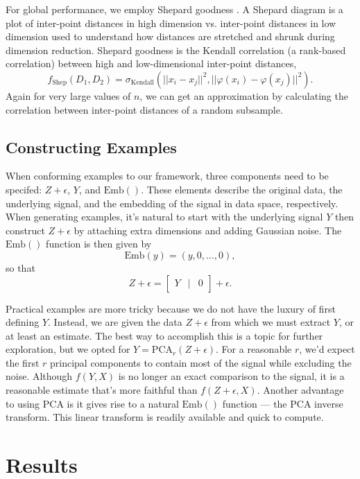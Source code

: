 \documentclass{article}
\begin{document}
\bigbreak For global performance, we employ Shepard goodness \cite{quantitative survey}. A Shepard diagram is a plot of inter-point distances in high dimension vs. inter-point distances in low dimension used to understand how distances are stretched and shrunk during dimension reduction. Shepard goodness is the Kendall correlation (a rank-based correlation) between high and low-dimensional inter-point distances, $$f_\textrm{Shep}(D_1, D_2) = \sigma_\textrm{Kendall}(||x_i - x_j||^2, ||\varphi(x_i) - \varphi(x_j)||^2).$$ Again for very large values of $n$, we can get an approximation by calculating the correlation between inter-point distances of a random subsample.

\subsection{Constructing Examples}
When conforming examples to our framework, three components need to be specifed: $Z + \epsilon$, $Y$, and $\textrm{Emb}()$. These elements describe the original data, the underlying signal, and the embedding of the signal in data space, respectively. When generating examples, it's natural to start with the underlying signal $Y$ then construct $Z + \epsilon$ by attaching extra dimensions and adding Gaussian noise. The $\textrm{Emb}()$ function is then given by $$\textrm{Emb}(y) = (y,0,\hdots,0),$$ so that
$$Z + \epsilon = \begin{bmatrix}
Y & \vert & 0
\end{bmatrix} + \epsilon.$$

\bigbreak Practical examples are more tricky because we do not have the luxury of first defining $Y$. Instead, we are given the data $Z + \epsilon$ from which we must extract $Y$, or at least an estimate. The best way to accomplish this is a topic for further exploration, but we opted for $Y = \textrm{PCA}_r(Z + \epsilon)$. For a reasonable $r$, we'd expect the first $r$ principal components to contain most of the signal while excluding the noise. Although $f(Y, X)$ is no longer an exact comparison to the signal, it is a reasonable estimate that's more faithful than $f(Z + \epsilon, X)$. Another advantage to using PCA is it gives rise to a natural $\textrm{Emb}()$ function --- the PCA inverse transform. This linear transform is readily available and quick to compute.

\section{Results}
\end{document}
